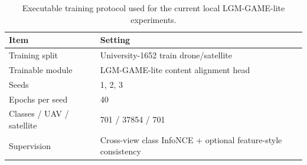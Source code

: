 \begin{table}[!t]
\centering
\footnotesize
\caption{Executable training protocol used for the current local LGM-GAME-lite experiments.}
\label{tab:training_protocol}
\begin{tabular}{lp{}}
\toprule
Item & Setting \\
\midrule
Training split & University-1652 train drone/satellite \\
Trainable module & LGM-GAME-lite content alignment head \\
Seeds & 1, 2, 3 \\
Epochs per seed & 40 \\
Classes / UAV / satellite & 701 / 37854 / 701 \\
Supervision & Cross-view class InfoNCE + optional feature-style consistency \\
\bottomrule
\end{tabular}
\end{table}
